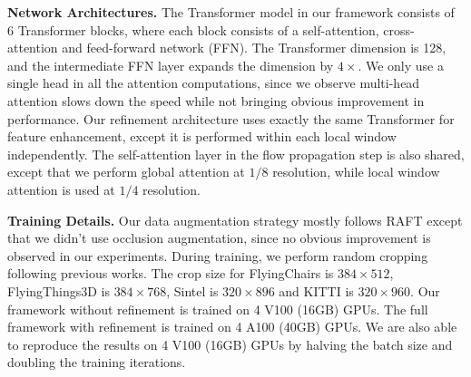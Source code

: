 \documentclass[10pt,twocolumn,letterpaper]{article}
\begin{document}
{\bf Network Architectures.} The Transformer model in our framework consists of 6 Transformer blocks, where each block consists of a self-attention, cross-attention and feed-forward network (FFN). The Transformer dimension is 128, and the intermediate FFN layer expands the dimension by $4\times$. We only use a single head in all the attention computations, since we observe multi-head attention slows down the speed while not bringing obvious improvement in performance. Our refinement architecture uses exactly the same Transformer for feature enhancement, except it is performed within each local window independently.  The self-attention layer in the flow propagation step is also shared, except that we perform global attention at $1/8$ resolution, while local window attention is used at $1/4$ resolution. 



{\bf Training Details.} Our data augmentation strategy mostly follows RAFT \cite{teed2020raft} except that we didn't use occlusion augmentation, since no obvious improvement is observed in our experiments. During training, we perform random cropping following previous works. The crop size for FlyingChairs is $384 \times 512$, FlyingThings3D is $384 \times 768$, Sintel is $320 \times 896$ and KITTI is $320 \times 960$. Our framework without refinement is trained on 4 V100 (16GB) GPUs. The full framework with refinement is trained on 4 A100 (40GB) GPUs. We are also able to reproduce the results on 4 V100 (16GB) GPUs by halving the batch size and doubling the training iterations.
\end{document}
